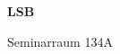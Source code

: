 \documentclass[a4paper]{article}
\begin{document}
\printGenericVSLHeader
\begin{center}
\begin{vsltext}{3cm}{4cm}

   \vspace{0.5cm} 

    \textbf{LSB} 

    \vspace{1.5cm}

    Seminarraum 134A

\end{vsltext}

\end{center}
\end{document}
